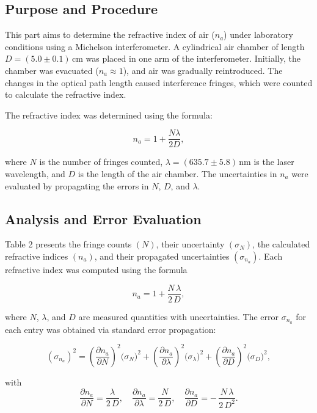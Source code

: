 \subsection{Purpose and Procedure}

This part aims to determine the refractive index of air (\(n_a\)) under laboratory conditions using a Michelson interferometer. A cylindrical air chamber of length \(D = (5.0 \pm 0.1) \, \text{cm}\) was placed in one arm of the interferometer. Initially, the chamber was evacuated (\(n_a \approx 1\)), and air was gradually reintroduced. The changes in the optical path length caused interference fringes, which were counted to calculate the refractive index.  

The refractive index was determined using the formula:  

\[
n_a = 1 + \frac{N \lambda}{2D},
\]  

where \(N\) is the number of fringes counted, \(\lambda = (635.7 \pm 5.8) \, \text{nm}\) is the laser wavelength, and \(D\) is the length of the air chamber. The uncertainties in \(n_a\) were evaluated by propagating the errors in \(N\), \(D\), and \(\lambda\).  

\subsection{Analysis and Error Evaluation}


Table 2 presents the fringe counts \((N)\), their uncertainty \((\sigma_{N})\), the calculated refractive indices \((n_a)\), and their propagated uncertainties \((\sigma_{n_a})\). Each refractive index was computed using the formula

\[
n_a = 1 + \frac{N\,\lambda}{2\,D},
\]

where \(N\), \(\lambda\), and \(D\) are measured quantities with uncertainties. The error \(\sigma_{n_a}\) for each entry was obtained via standard error propagation:

\[
(\sigma_{n_a})^2
= \left(\frac{\partial n_a}{\partial N}\right)^2 \bigl(\sigma_N\bigr)^2
+ \left(\frac{\partial n_a}{\partial \lambda}\right)^2 \bigl(\sigma_\lambda\bigr)^2
+ \left(\frac{\partial n_a}{\partial D}\right)^2 \bigl(\sigma_D\bigr)^2,
\]

with
\[
\frac{\partial n_a}{\partial N} = \frac{\lambda}{2\,D}, \quad
\frac{\partial n_a}{\partial \lambda} = \frac{N}{2\,D}, \quad
\frac{\partial n_a}{\partial D} = -\,\frac{N\,\lambda}{2\,D^2}.
\]

